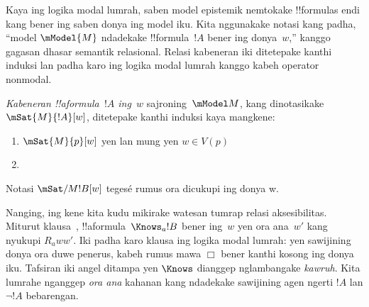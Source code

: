 \documentclass[../../../include/open-logic-section]{subfiles}
\begin{document}


Kaya ing logika modal lumrah, saben model epistemik nemtokake !!{formula}s
endi kang bener ing saben donya ing model iku. Kita nggunakake notasi kang
padha, ``model $\mModel{M}$ ndadekake !!{formula}~$!A$ bener ing
donya~$w$,'' kanggo gagasan dhasar semantik relasional. Relasi kabeneran
iki ditetepake kanthi induksi lan padha karo ing logika modal lumrah
kanggo kabeh operator nonmodal.

\begin{defn}
  \emph{Kabeneran !!a{formula}~$!A$ ing~$w$} sajroning~$\mModel M$,
  kang dinotasikake $\mSat{M}{!A}[w]$, ditetepake kanthi induksi
  kaya mangkene:
  \begin{enumerate}
  \item $\mSat{M}{p}[w]$ yen lan mung yen $w \in V(p)$
  \item{}
  \end{enumerate} 
\end{defn}
Notasi $\mSat/{M}{!B}[w]$ tegesé rumus ora dicukupi ing donya w.

Nanging, ing kene kita kudu mikirake watesan tumrap relasi
aksesibilitas. Miturut klausa~,
!!a{formula}~$\Knows_a !B$ bener ing~$w$ yen ora ana~$w'$ kang
nyukupi $R_a ww'$. Iki padha karo klausa ing logika modal lumrah:
yen sawijining donya ora duwe penerus, kabeh rumus mawa
$\Box$ bener kanthi kosong ing donya iku. Tafsiran iki angel
ditampa yen $\Knows$ dianggep nglambangake \emph{kawruh}.
Kita lumrahe nganggep \emph{ora ana} kahanan kang ndadekake sawijining agen
ngerti $!A$ lan $\lnot !A$ bebarengan.
\end{document}
